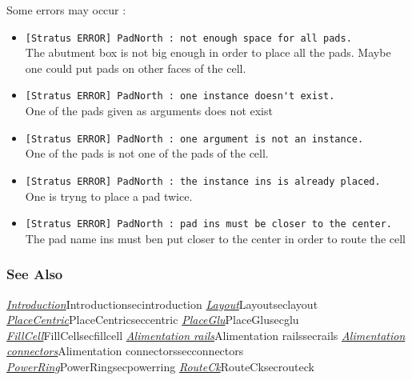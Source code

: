 Some errors may occur :
\begin{itemize}
    \item \verb-[Stratus ERROR] PadNorth : not enough space for all pads.-\\The abutment box is not big enough in order to place all the pads. Maybe one could put pads on other faces of the cell.
    \item \verb-[Stratus ERROR] PadNorth : one instance doesn't exist.-\\One of the pads given as arguments does not exist
    \item \verb-[Stratus ERROR] PadNorth : one argument is not an instance.-\\One of the pads is not one of the pads of the cell.
    \item \verb-[Stratus ERROR] PadNorth : the instance ins is already placed.-\\One is tryng to place a pad twice.
    \item \verb-[Stratus ERROR] PadNorth : pad ins must be closer to the center.-\\The pad name ins must ben put closer to the center in order to route the cell
\end{itemize}

\subsubsection{See Also}

\hyperref[ref]{\emph{Introduction}}{}{Introduction}{secintroduction}
\hyperref[ref]{\emph{Layout}}{}{Layout}{seclayout}
\hyperref[ref]{\emph{PlaceCentric}}{}{PlaceCentric}{seccentric}
\hyperref[ref]{\emph{PlaceGlu}}{}{PlaceGlu}{secglu}
\hyperref[ref]{\emph{FillCell}}{}{FillCell}{secfillcell}
\hyperref[ref]{\emph{Alimentation rails}}{}{Alimentation rails}{secrails}
\hyperref[ref]{\emph{Alimentation connectors}}{}{Alimentation connectors}{secconnectors}
\hyperref[ref]{\emph{PowerRing}}{}{PowerRing}{secpowerring}
\hyperref[ref]{\emph{RouteCk}}{}{RouteCk}{secrouteck}
